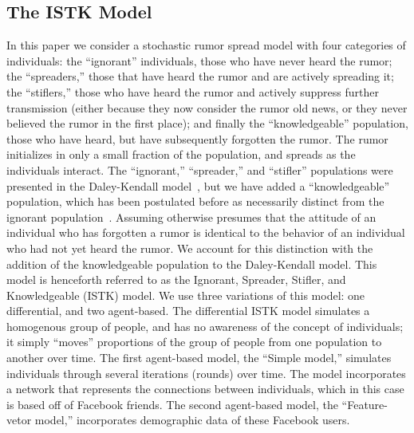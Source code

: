 \subsection{The ISTK Model}
\label{subsec:istk}

In this paper we consider a stochastic rumor spread model with four categories of individuals: the ``ignorant'' individuals, those who have never heard the rumor; the ``spreaders,'' those that have heard the rumor and are actively spreading it; the ``stiflers,'' those who have heard the rumor and actively suppress further transmission (either because they now consider the rumor old news, or they never believed the rumor in the first place); and finally the ``knowledgeable'' population, those who have heard, but have subsequently forgotten the rumor.
The rumor initializes in only a small fraction of the population, and spreads as the individuals interact.
The ``ignorant,'' ``spreader,'' and ``stifler'' populations were presented in the Daley-Kendall model~\cite{daley-1965}, but we have added a ``knowledgeable'' population, which has been postulated before as necessarily distinct from the ignorant population~\cite{zhao-2012, zhao-2011}.
Assuming otherwise presumes that the attitude of an individual who has forgotten a rumor is identical to the behavior of an individual who had not yet heard the rumor.
We account for this distinction with the addition of the knowledgeable population to the Daley-Kendall model.
This model is henceforth referred to as the Ignorant, Spreader, Stifler, and Knowledgeable (ISTK) model.
We use three variations of this model: one differential, and two agent-based.
The differential ISTK model simulates a homogenous group of people, and has no awareness of the concept of individuals; it simply ``moves'' proportions of the group of people from one population to another over time.
The first agent-based model, the ``Simple model,'' simulates individuals through several iterations (rounds) over time.
The model incorporates a network that represents the connections between individuals, which in this case is based off of Facebook friends.
The second agent-based model, the ``Feature-vetor model,'' incorporates demographic data of these Facebook users.

